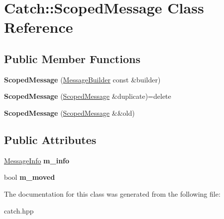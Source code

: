 \hypertarget{classCatch_1_1ScopedMessage}{}\section{Catch\+::Scoped\+Message Class Reference}
\label{classCatch_1_1ScopedMessage}
\subsection*{Public Member Functions}
\begin{DoxyCompactItemize}
\item 
\mbox{\label{classCatch_1_1ScopedMessage_a5cc59f0f2ebe840e6607f83004d49a17}} 
{\bfseries Scoped\+Message} (\mbox{\hyperlink{structCatch_1_1MessageBuilder}{Message\+Builder}} const \&builder)
\item 
\mbox{\label{classCatch_1_1ScopedMessage_a5fe2e79afdfd737818c15edfc49f378e}} 
{\bfseries Scoped\+Message} (\mbox{\hyperlink{classCatch_1_1ScopedMessage}{Scoped\+Message}} \&duplicate)=delete
\item 
\mbox{\label{classCatch_1_1ScopedMessage_aac833a6a2245a26e6bd5c9252ca1caa0}} 
{\bfseries Scoped\+Message} (\mbox{\hyperlink{classCatch_1_1ScopedMessage}{Scoped\+Message}} \&\&old)
\end{DoxyCompactItemize}
\subsection*{Public Attributes}
\begin{DoxyCompactItemize}
\item 
\mbox{\label{classCatch_1_1ScopedMessage_ae6e1476f389cc6e1586f033b3747b27b}} 
\mbox{\hyperlink{structCatch_1_1MessageInfo}{Message\+Info}} {\bfseries m\+\_\+info}
\item 
\mbox{\label{classCatch_1_1ScopedMessage_a4fe5607c1f7407240a0da8405b1c12e7}} 
bool {\bfseries m\+\_\+moved}
\end{DoxyCompactItemize}


The documentation for this class was generated from the following file\+:\begin{DoxyCompactItemize}
\item 
catch.\+hpp\end{DoxyCompactItemize}
